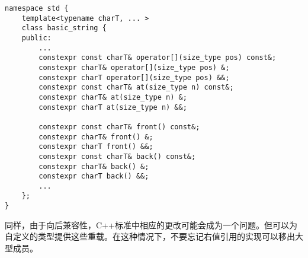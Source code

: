 \begin{lstlisting}[caption={}]
namespace std {
	template<typename charT, ... >
	class basic_string {
	public:
		...
		constexpr const charT& operator[](size_type pos) const&;
		constexpr charT& operator[](size_type pos) &;
		constexpr charT operator[](size_type pos) &&;
		constexpr const charT& at(size_type n) const&;
		constexpr charT& at(size_type n) &;
		constexpr charT at(size_type n) &&;
		
		constexpr const charT& front() const&;
		constexpr charT& front() &;
		constexpr charT front() &&;
		constexpr const charT& back() const&;
		constexpr charT& back() &;
		constexpr charT back() &&;
		...
	};
}
\end{lstlisting}

同样，由于向后兼容性，C++标准中相应的更改可能会成为一个问题。但可以为自定义的类型提供这些重载。在这种情况下，不要忘记右值引用的实现可以移出大型成员。\par























































